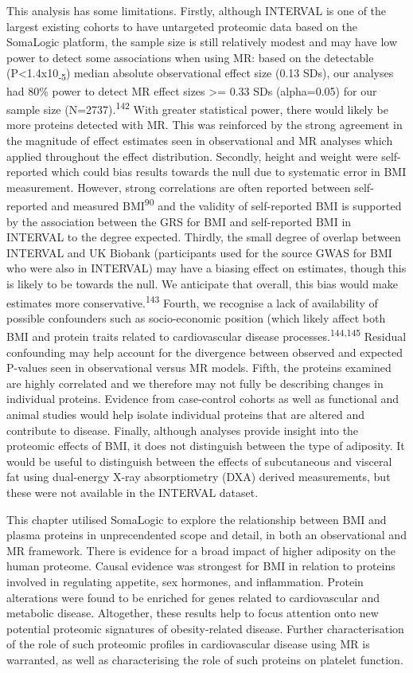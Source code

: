 \documentclass[11pt,twoside]{bristolthesis}
\begin{document}
This analysis has some limitations. Firstly, although INTERVAL is one of the largest existing cohorts to have untargeted proteomic data based on the SomaLogic platform, the sample size is still relatively modest and may have low power to detect some associations when using MR: based on the detectable (P\textless1.4x10\textsubscript{-5}) median absolute observational effect size (0.13 SDs), our analyses had 80\% power to detect MR effect sizes \textgreater= 0.33 SDs (alpha=0.05) for our sample size (N=2737).\textsuperscript{142} With greater statistical power, there would likely be more proteins detected with MR. This was reinforced by the strong agreement in the magnitude of effect estimates seen in observational and MR analyses which applied throughout the effect distribution. Secondly, height and weight were self-reported which could bias results towards the null due to systematic error in BMI measurement. However, strong correlations are often reported between self-reported and measured BMI\textsuperscript{90} and the validity of self-reported BMI is supported by the association between the GRS for BMI and self-reported BMI in INTERVAL to the degree expected. Thirdly, the small degree of overlap between INTERVAL and UK Biobank (participants used for the source GWAS for BMI who were also in INTERVAL) may have a biasing effect on estimates, though this is likely to be towards the null. We anticipate that overall, this bias would make estimates more conservative.\textsuperscript{143} Fourth, we recognise a lack of availability of possible confounders such as socio-economic position (which likely affect both BMI and protein traits related to cardiovascular disease processes.\textsuperscript{144,145} Residual confounding may help account for the divergence between observed and expected P-values seen in observational versus MR models. Fifth, the proteins examined are highly correlated and we therefore may not fully be describing changes in individual proteins. Evidence from case-control cohorts as well as functional and animal studies would help isolate individual proteins that are altered and contribute to disease. Finally, although analyses provide insight into the proteomic effects of BMI, it does not distinguish between the type of adiposity. It would be useful to distinguish between the effects of subcutaneous and visceral fat using dual-energy X-ray absorptiometry (DXA) derived measurements, but these were not available in the INTERVAL dataset.

This chapter utilised SomaLogic to explore the relationship between BMI and plasma proteins in unprecendented scope and detail, in both an observational and MR framework. There is evidence for a broad impact of higher adiposity on the human proteome. Causal evidence was strongest for BMI in relation to proteins involved in regulating appetite, sex hormones, and inflammation. Protein alterations were found to be enriched for genes related to cardiovascular and metabolic disease. Altogether, these results help to focus attention onto new potential proteomic signatures of obesity-related disease. Further characterisation of the role of such proteomic profiles in cardiovascular disease using MR is warranted, as well as characterising the role of such proteins on platelet function.
\end{document}
